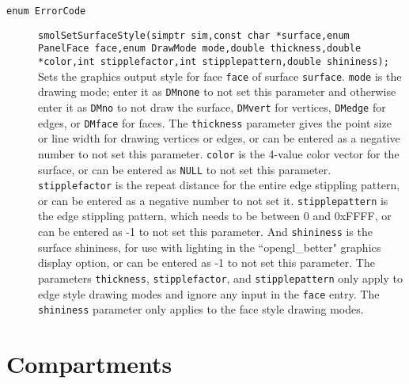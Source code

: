 \documentclass {book}
\begin{document}
\begin{description}
\item[\texttt{enum ErrorCode}]
\texttt{smolSetSurfaceStyle(simptr sim,const char *surface,enum PanelFace face,enum DrawMode mode,double thickness,double *color,int stipplefactor,int stipplepattern,double shininess);}
\hfill \\
Sets the graphics output style for face \texttt{face} of surface \texttt{surface}. \texttt{mode} is the drawing mode; enter it as \texttt{DMnone} to not set this parameter and otherwise enter it as \texttt{DMno} to not draw the surface, \texttt{DMvert} for vertices, \texttt{DMedge} for edges, or \texttt{DMface} for faces. The \texttt{thickness} parameter gives the point size or line width for drawing vertices or edges, or can be entered as a negative number to not set this parameter. \texttt{color} is the 4-value color vector for the surface, or can be entered as \texttt{NULL} to not set this parameter. \texttt{stipplefactor} is the repeat distance for the entire edge stippling pattern, or can be entered as a negative number to not set it. \texttt{stipplepattern} is the edge stippling pattern, which needs to be between 0 and 0xFFFF, or can be entered as -1 to not set this parameter. And \texttt{shininess} is the surface shininess, for use with lighting in the ``opengl\_better" graphics display option, or can be entered as -1 to not set this parameter. The parameters \texttt{thickness}, \texttt{stipplefactor}, and \texttt{stipplepattern} only apply to edge style drawing modes and ignore any input in the \texttt{face} entry. The \texttt{shininess} parameter only applies to the face style drawing modes.

\end{description}

\section{Compartments}
\end{document}
